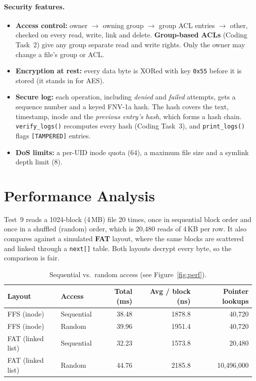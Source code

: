 \documentclass[11pt]{article}
\newcommand{\perfFFSseqMs}{38.48}   \newcommand{\perfFFSseqNs}{1878.8}
\newcommand{\perfFFSrandMs}{39.96}  \newcommand{\perfFFSrandNs}{1951.4}
\newcommand{\perfFATseqMs}{32.23}   \newcommand{\perfFATseqNs}{1573.8}
\newcommand{\perfFATrandMs}{44.76}  \newcommand{\perfFATrandNs}{2185.8}
\begin{document}
\paragraph{Security features.}
\begin{itemize}
  \item \textbf{Access control:} owner $\rightarrow$ owning group
        $\rightarrow$ group ACL entries $\rightarrow$ other, checked on every
        read, write, link and delete. \textbf{Group-based ACLs}
        (Coding Task~2) give any group separate read and write rights. Only
        the owner may change a file's group or ACL.
  \item \textbf{Encryption at rest:} every data byte is XORed with key
        \texttt{0x55} before it is stored (it stands in for AES).
  \item \textbf{Secure log:} each operation, including \emph{denied} and
        \emph{failed} attempts, gets a sequence number and a keyed FNV-1a
        hash. The hash covers the text, timestamp, inode and the
        \emph{previous entry's hash}, which forms a hash chain.
        \texttt{verify\_logs()} recomputes every hash (Coding Task~3), and
        \texttt{print\_logs()} flags \texttt{[TAMPERED]} entries.
  \item \textbf{DoS limits:} a per-UID inode quota (64), a maximum file
        size and a symlink depth limit (8).
\end{itemize}

\section{Performance Analysis}
Test~9 reads a 1024-block (4\,MB) file 20 times, once in sequential block
order and once in a shuffled (random) order, which is 20{,}480 reads of
4\,KB per row. It also compares against a simulated \textbf{FAT} layout,
where the same blocks are scattered and linked through a
\texttt{next[]} table. Both layouts decrypt every byte, so the comparison
is fair.

\begin{table}[H]
\centering
\begin{tabular}{llrrr}
\toprule
Layout & Access & Total (ms) & Avg / block (ns) & Pointer lookups \\
\midrule
FFS (inode)      & Sequential & \perfFFSseqMs  & \perfFFSseqNs  & 40{,}720 \\
FFS (inode)      & Random     & \perfFFSrandMs & \perfFFSrandNs & 40{,}720 \\
FAT (linked list)& Sequential & \perfFATseqMs  & \perfFATseqNs  & 20{,}480 \\
FAT (linked list)& Random     & \perfFATrandMs & \perfFATrandNs & 10{,}496{,}000 \\
\bottomrule
\end{tabular}
\caption{Sequential vs.\ random access (see Figure~\ref{fig:perf}).}
\end{table}
\end{document}
